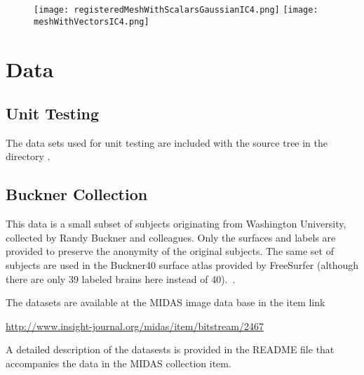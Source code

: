 \documentclass{InsightArticle}
\begin{document}
\begin{figure}
\center
\texttt{[image: registeredMeshWithScalarsGaussianIC4.png]}
\texttt{[image: meshWithVectorsIC4.png]}
\label{fig:OutputMeshes}
\end{figure}


\clearpage


\section{Data}

\subsection{Unit Testing}

The data sets used for unit testing are included with the source tree in the
directory .

\subsection{Buckner Collection}

This data is a small subset of subjects originating from Washington University,
collected by Randy Buckner and colleagues. Only the surfaces and labels are
provided to preserve the anonymity of the original subjects. The same set of
subjects are used in the Buckner40 surface atlas provided by FreeSurfer
(although there are only 39 labeled brains here instead of
40).~\cite{Desikan2006,Dale1999,Fischl1999,Fischl2001}.

The datasets are available at the MIDAS image data base in the item link

\begin{center}
\url{http://www.insight-journal.org/midas/item/bitstream/2467}
\end{center}

A detailed description of the datasests is provided in the README file that
accompanies the data in the MIDAS collection item.


%
%



\end{document}

